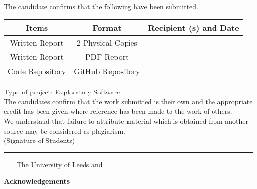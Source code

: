 \frontcover\

\noindent The candidate confirms that the following have been submitted.
\begin{table}[ht!]
    \begin{tabular}{*{3}{c}}
        \toprule
        Items & Format & Recipient (s) and Date \\ 
        \midrule
        \midrule
        Written Report & 2 Physical Copies & \\ 
        \midrule
        Written Report & PDF Report & \\
        \midrule
        Code Repository & GitHub Repository & \\
        \bottomrule
    \end{tabular}
\end{table}

\noindent Type of project: Exploratory Software
\vspace{\fill}\\
\noindent The candidates confirm that the work submitted is their own and the
appropriate credit has been given where reference has been made to the
work of others.
\vspace{\fill}\\
\noindent We understand that failure to attribute material which is obtained
from another source may be considered as plagiarism.
\vspace{\fill}\\
\flushright(Signature of Students) \rule{100mm}{1pt}
\flushleft\
\vspace{\fill}
\textcopyright~\session~The University of Leeds and~\fullname\

\begin{dissertationsummary}

\end{dissertationsummary}

\clearpage
\centering\textbf{Acknowledgements}
\flushleft\


\tableofcontents


